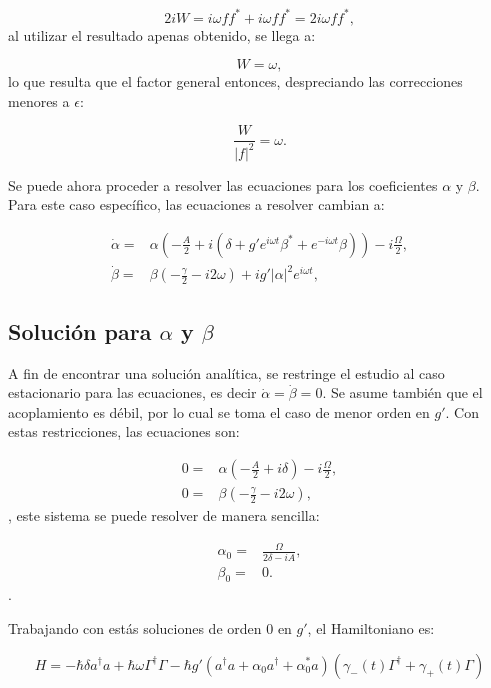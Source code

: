 \documentclass[a4paper,10pt]{report}
\begin{document}
\begin{equation}
2iW = i\omega ff^* + i\omega ff^* = 2i\omega ff^*,
\end{equation} al utilizar el resultado apenas obtenido, se llega a:

\begin{equation}
W = \omega,
\end{equation} lo que resulta que el factor general entonces, despreciando las correcciones menores a $\epsilon$:

\begin{equation}
\frac{W}{|f|^2} = \omega.
\end{equation}

Se puede ahora proceder a resolver las ecuaciones para los coeficientes $\alpha$ y $\beta$. Para este caso específico, las ecuaciones a resolver cambian a:

\begin{align}
\dot{\alpha} =& \alpha(-\frac{A}{2}+i(\delta+g'e^{i\omega t} \beta^* + e^{-i\omega t} \beta))-i\frac{\Omega}{2},\\
\dot{\beta} =& \beta(-\frac{\gamma}{2}-i 2\omega)+ig'|\alpha|^2e^{i\omega t},
\end{align}

\subsection{Solución para $\alpha$ y $\beta$}

A fin de encontrar una solución analítica, se restringe el estudio al caso estacionario para las ecuaciones, es decir $\dot{\alpha}= \dot{\beta} = 0$. Se asume también que el acoplamiento es débil, por lo cual se toma el caso de menor orden en $g'$. Con estas restricciones, las ecuaciones son:

\begin{align}
0 =& \alpha(-\frac{A}{2}+i\delta)-i\frac{\Omega}{2},\\
0 =& \beta(-\frac{\gamma}{2}-i 2\omega),
\end{align}, este sistema se puede resolver de manera sencilla:

\begin{align}
\alpha_0 =& \frac{\Omega}{2\delta-iA},\\
\beta_0 =& 0.
\end{align}. 

Trabajando con estás soluciones de orden $0$ en $g'$, el Hamiltoniano es:

\begin{equation}
H = -\hbar \delta a^{\dagger}a +\hbar\omega\Gamma^{\dagger}\Gamma -\hbar g'(a^{\dagger}a +\alpha_0 a^{\dagger}+\alpha^*_0 a)(\gamma_-(t)\Gamma^{\dagger}+\gamma_+(t)\Gamma)
\end{equation}
\end{document}
